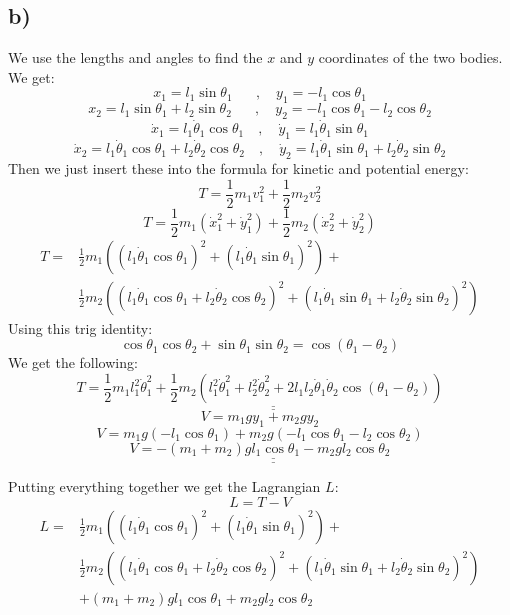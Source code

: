 \documentclass{article}
\begin{document}
\subsection*{b)}
We use the lengths and angles to find the $x$ and $y$ coordinates of the two bodies. We get:
\[
x_1 = l_1 \sin θ_1 \quad  \ \ \ , \quad y_1 = -l_1 \cos θ_1
\]
\[
x_2 = l_1 \sin θ_1 + l_2 \sin θ_2 \quad \ \ \ , \quad y_2 = -l_1 \cos θ_1 - l_2 \cos θ_2
\]
\[
\dot{x}_1 = l_1 \dot{θ}_1 \cos θ_1 \quad , \quad \dot{y}_1 = l_1 \dot{θ}_1 \sin θ_1
\]
\[
\dot{x}_2 = l_1 \dot{θ}_1 \cos θ_1 + l_2 \dot{θ}_2 \cos θ_2 \quad , \quad \dot{y}_2 = l_1 \dot{θ}_1 \sin θ_1 + l_2 \dot{θ}_2 \sin θ_2
\]
Then we just insert these into the formula for kinetic and potential energy: 
\[
T = \frac{1}{2}m_1 v_1^2 + \frac{1}{2}m_2 v_2^2
\]
\[
T = \frac{1}{2} m_1 \left( \dot{x}_1^2 + \dot{y}_1^2 \right) + \frac{1}{2} m_2 \left( \dot{x}_2^2 + \dot{y}_2^2 \right)
\]
\begin{align*}
T = &\frac{1}{2} m_1 \left( \left( l_1 \dot{θ}_1 \cos θ_1 \right)^2 + \left( l_1 \dot{θ}_1 \sin θ_1 \right)^2 \right) + \\ &\frac{1}{2} m_2 \left( \left( l_1 \dot{θ}_1 \cos θ_1 + l_2 \dot{θ}_2 \cos θ_2 \right)^2 + \left( l_1 \dot{θ}_1 \sin θ_1 + l_2 \dot{θ}_2 \sin θ_2 \right)^2 \right)
\end{align*}
Using this trig identity:
\[
\cos θ_1 \cos θ_2 + \sin θ_1 \sin θ_2 = \cos(θ_1 - θ_2)
\]
We get the following:
\[
T = \underline{\underline{\frac{1}{2}m_1l_1^2\dot{θ}_1^2 + \frac{1}{2}m_2\left(l_1^2\dot{θ}_1^2 + l_2^2\dot{θ}_2^2 + 2l_1l_2\dot{θ}_1\dot{θ}_2\cos(θ_1 - θ_2)\right)}}
\]
\[
V = m_1 g y_1 + m_2 g y_2
\]
\[
V = m_1 g (-l_1 \cos θ_1) + m_2 g (-l_1 \cos θ_1 - l_2 \cos θ_2)
\]
\[
V = \underline{\underline{-(m_1 + m_2) g l_1 \cos θ_1 - m_2 g l_2 \cos θ_2}}
\]

Putting everything together we get the Lagrangian $L$:
\[
L = T - V
\]
\begin{align*}
L = &\frac{1}{2} m_1 \left( \left( l_1 \dot{θ}_1 \cos θ_1 \right)^2 + \left( l_1 \dot{θ}_1 \sin θ_1 \right)^2 \right) + \\ &\frac{1}{2} m_2 \left( \left( l_1 \dot{θ}_1 \cos θ_1 + l_2 \dot{θ}_2 \cos θ_2 \right)^2 + \left( l_1 \dot{θ}_1 \sin θ_1 + l_2 \dot{θ}_2 \sin θ_2 \right)^2 \right) \\ &+(m_1 + m_2) g l_1 \cos θ_1 + m_2 g l_2 \cos θ_2
\end{align*}
\end{document}
